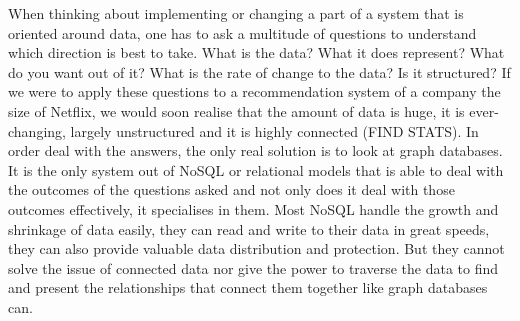 \documentclass[a4paper]{article}
\begin{document}
When thinking about implementing or changing a part of a system that is oriented around data, one has to ask a multitude of questions to understand which direction is best to take. What is the data? What it does represent? What do you want out of it? What is the rate of change to the data? Is it structured? If we were to apply these questions to a recommendation system of a company the size of Netflix, we would soon realise that the amount of data is huge, it is ever-changing, largely unstructured and it is highly connected (FIND STATS). In order deal with the answers, the only real solution is to look at graph databases. It is the only system out of NoSQL or relational models that is able to deal with the outcomes of the questions asked and not only does it deal with those outcomes effectively, it specialises in them. Most NoSQL handle the growth and shrinkage of data easily, they can read and write to their data in great speeds, they can also provide valuable data distribution and protection. But they cannot solve the issue of connected data nor give the power to traverse the data to find and present the relationships that connect them together like graph databases can. \par
\end{document}
